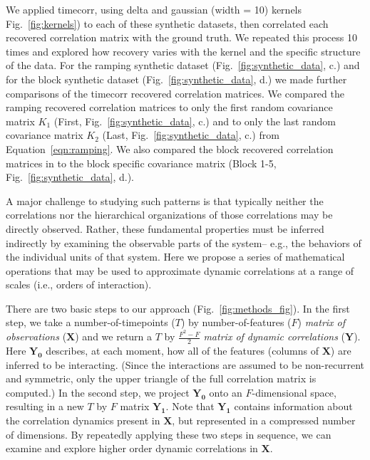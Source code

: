 We applied timecorr, using delta and gaussian (width = 10) kernels
Fig.~\ref{fig:kernels}) to each of these 
synthetic datasets, then correlated each recovered
correlation matrix with the ground truth.  We repeated this process 10
times and explored how recovery varies
with the kernel and the specific structure of the data. For the
ramping synthetic dataset (Fig.~\ref{fig:synthetic_data},  c.)  and for the
block synthetic dataset (Fig.~\ref{fig:synthetic_data},  d.)  we made further
comparisons of the timecorr recovered correlation matrices. We
compared the ramping recovered correlation matrices to only the first random covariance matrix $K_{1}$
(First, Fig.~\ref{fig:synthetic_data},  c.) and to only the last
random covariance matrix $K_{2}$ (Last, Fig.~\ref{fig:synthetic_data},
c.) from Equation~\ref{eqn:ramping}. We also compared the block recovered correlation matrices in to
the block specific covariance matrix (Block 1-5,
Fig.~\ref{fig:synthetic_data},  d.).










A major challenge to studying such patterns is that typically neither
the correlations nor the hierarchical organizations of those
correlations may be directly observed.  Rather, these fundamental
properties must be inferred indirectly by examining the observable
parts of the system-- e.g., the behaviors of the individual units of
that system.  Here we propose a series of mathematical operations that may be used to approximate dynamic correlations at a range of scales (i.e., orders of interaction).

There are two basic steps to our approach (Fig.~\ref{fig:methods_fig}).  In the first step, we take
a number-of-timepoints ($T$) by number-of-features ($F$)
\textit{matrix of observations} ($\mathbf{X}$) and we return a $T$ by
$\frac{F^2 - F}{2}$ \textit{matrix of dynamic correlations}
($\mathbf{Y}$).  Here $\mathbf{Y_0}$ describes, at each moment, how
all of the features (columns of $\mathbf{X}$) are inferred to be
interacting.  (Since the interactions are assumed to be non-recurrent
and symmetric, only the upper triangle of the full correlation matrix
is computed.)  In the second step, we project $\mathbf{Y_0}$ onto an
$F$-dimensional space, resulting in a new $T$ by $F$ matrix
$\mathbf{Y_1}$.  Note that $\mathbf{Y_1}$ contains information about
the correlation dynamics present in $\mathbf{X}$, but represented in a
compressed number of dimensions.  By repeatedly applying these two
steps in sequence, we can examine and explore higher order dynamic
correlations in $\mathbf{X}$.

